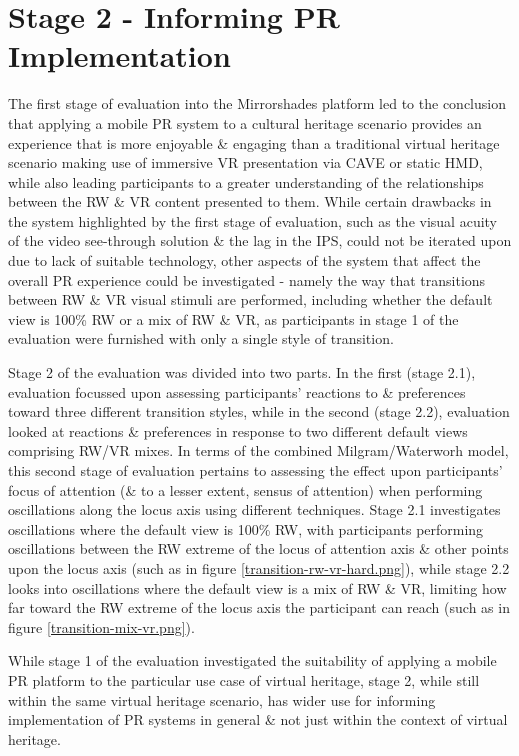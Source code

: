 \clearpage

\section{Stage 2 - Informing PR Implementation}

The first stage of evaluation into the Mirrorshades platform led to the conclusion that applying a mobile PR system to a cultural heritage scenario provides an experience that is more enjoyable \& engaging than a traditional virtual heritage scenario making use of immersive VR presentation via CAVE or static HMD, while also leading participants to a greater understanding of the relationships between the RW \& VR content presented to them. While certain drawbacks in the system highlighted by the first stage of evaluation, such as the visual acuity of the video see-through solution \& the lag in the IPS, could not be iterated upon due to lack of suitable technology, other aspects of the system that affect the overall PR experience could be investigated - namely the way that transitions between RW \& VR visual stimuli are performed, including whether the default view is 100\% RW or a mix of RW \& VR, as participants in stage 1 of the evaluation were furnished with only a single style of transition.

Stage 2 of the evaluation was divided into two parts. In the first (stage 2.1), evaluation focussed upon assessing participants' reactions to \& preferences toward three different transition styles, while in the second (stage 2.2), evaluation looked at reactions \& preferences in response to two different default views comprising RW/VR mixes. In terms of the combined Milgram/Waterworh model, this second stage of evaluation pertains to assessing the effect upon participants' focus of attention (\& to a lesser extent, sensus of attention) when performing oscillations along the locus axis using different techniques. Stage 2.1 investigates oscillations where the default view is 100\% RW, with participants performing oscillations between the RW extreme of the locus of attention axis \& other points upon the locus axis (such as in figure \ref{transition-rw-vr-hard.png}), while stage 2.2 looks into oscillations where the default view is a mix of RW \& VR, limiting how far toward the RW extreme of the locus axis the participant can reach (such as in figure \ref{transition-mix-vr.png}).

While stage 1 of the evaluation investigated the suitability of applying a mobile PR platform to the particular use case of virtual heritage, stage 2, while still within the same virtual heritage scenario, has wider use for informing implementation of PR systems in general \& not just within the context of virtual heritage.

